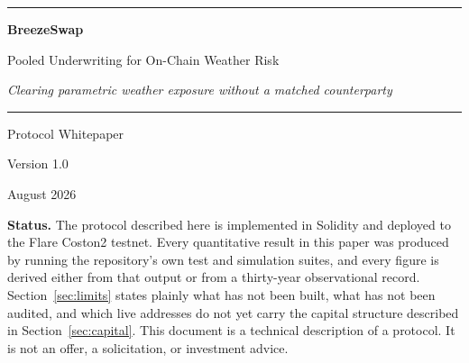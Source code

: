 \documentclass[11pt,a4paper]{article}
\begin{document}
\begin{titlepage}
\centering
\vspace*{2.2cm}

{\color{bzblue}\rule{0.32\linewidth}{1.2pt}}

\vspace{1.0cm}
{\Huge\bfseries BreezeSwap\par}
\vspace{0.5cm}
{\LARGE Pooled Underwriting for On-Chain Weather Risk\par}
\vspace{0.7cm}
{\large\itshape Clearing parametric weather exposure without a matched counterparty\par}

\vspace{0.9cm}
{\color{bzblue}\rule{0.32\linewidth}{1.2pt}}

\vspace{2.0cm}
{\large Protocol Whitepaper\par}
\vspace{0.3cm}
{\normalsize Version 1.0\par}
\vspace{0.2cm}
{\normalsize August 2026\par}

\vfill

\begin{minipage}{0.86\linewidth}
\small
\textbf{Status.} The protocol described here is implemented in Solidity and deployed
to the Flare Coston2 testnet. Every quantitative result in this paper was produced by
running the repository's own test and simulation suites, and every figure is derived
either from that output or from a thirty-year observational record. Section~\ref{sec:limits}
states plainly what has not been built, what has not been audited, and which live
addresses do not yet carry the capital structure described in Section~\ref{sec:capital}.
This document is a technical description of a protocol. It is not an offer, a solicitation,
or investment advice.
\end{minipage}

\vspace{1.4cm}
\end{titlepage}

\thispagestyle{plain}
\tableofcontents
\newpage
\end{document}
